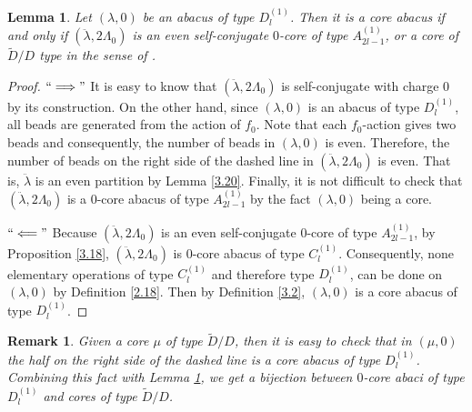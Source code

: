 \documentclass[11pt]{amsart}
\theoremstyle{plain}
\numberwithin{equation}{subsection}
\newtheorem{lemma}[theorem]{Lemma}
\newtheorem{remark}[theorem]{Remark}
\newcommand{\lam}{\lambda}
\begin{document}
\begin{lemma}\label{3.21}
Let $(\lam, 0)$ be an abacus of type $D_l^{(1)}$. Then it is a core abacus if and only if 
$(\ddot{\lam}, 2\Lambda_0)$ is an even self-conjugate $0$-core of type $A^{(1)}_{2l-1}$,
or a core of $\tilde{D}/D$ type in the sense of \cite{HJ2}.  
\end{lemma}

\begin{proof}
$``\Longrightarrow"$ It is easy to know that $(\ddot{\lam}, 2\Lambda_0)$ is self-conjugate with charge 0 by its construction. 
On the other hand, since $(\lam, 0)$ is an abacus of type $D_l^{(1)}$, all beads are generated from the action of $f_0$. 
Note that each $f_0$-action gives two beads and consequently, the number of beads in $(\lam, 0)$ is even. Therefore, the
number of beads on the right side of the dashed line in $(\ddot{\lam}, 2\Lambda_0)$ is even. That is, $\ddot{\lam}$ is an even partition by Lemma \ref{3.20}. 
Finally, it is not difficult to check that $(\ddot{\lam}, 2\Lambda_0)$ is a $0$-core abacus of type $A^{(1)}_{2l-1}$ by the fact $(\lam, 0)$ being a core.

$``\Longleftarrow"$ Because $(\ddot{\lam}, 2\Lambda_0)$ is an even self-conjugate $0$-core of type $A^{(1)}_{2l-1}$, by Proposition \ref{3.18}, 
$(\ddot{\lam}, 2\Lambda_0)$ is 0-core abacus of type $C_l^{(1)}$.
Consequently, none elementary operations of type $C_l^{(1)}$ and therefore type $D_l^{(1)}$, can be done on $(\lam, 0)$ by Definition \ref{2.18}. 
Then by Definition \ref{3.2}, $(\lam, 0)$ is a core abacus of type $D_l^{(1)}$.
\end{proof}

\begin{remark}{\rm 
Given a core $\mu$ of type $\tilde{D}/D$, then it is easy to check that 
in $(\mu, 0)$ the half on the right side of the dashed line is a core abacus of type $D_l^{(1)}$.
Combining this fact with Lemma \ref{3.21}, we get a bijection between $0$-core abaci of type $D_l^{(1)}$ and cores of type $\tilde{D}/D$.}
\end{remark}
\end{document}
